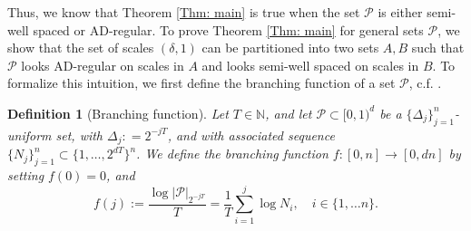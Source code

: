 \documentclass{amsart}
\newtheorem{definition}[prop]{Definition}
\newcommand{\cP}{\mathcal{P}}
\begin{document}
Thus, we know that Theorem \ref{Thm: main} is true when the set $\cP$ is either semi-well spaced or AD-regular. To prove Theorem \ref{Thm: main} for general sets $\cP$, we show that the set of scales $(\delta, 1)$ can be partitioned into two sets $A, B$ such that $\cP$ looks AD-regular on scales in $A$ and looks semi-well spaced on scales in $B$. To formalize this intuition, we first define the branching function of a set $\cP$, c.f. \cite[Definition 2.22]{orponen2023projections}.

\begin{definition}[Branching function]
    Let $T\in \mathbb{N}$, and let $\cP\subset [0,1)^d$ be a $\{\Delta_j\}_{j=1}^n$-uniform set, with $\Delta_j: = 2^{-jT}$, and with associated sequence $\{N_j\}_{j=1}^n\subset \{ 1, \dots, 2^{dT}\}^n$. 
    We define the \emph{branching function} $f: [0, n]\rightarrow [0, dn]$ by setting $f(0)=0$, and 
    \[
    f(j):=\frac{\log |\cP|_{2^{-jT}}}{T} =\frac{1}{T}\sum_{i=1}^j \log N_i, \quad i \in \{1, \dots n\}. 
    \]
\end{definition}


\end{document}

